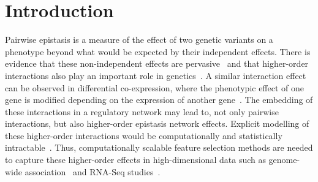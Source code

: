 \documentclass{bioinfo}
\begin{document}

\maketitle

\newpage

\section{Introduction}

Pairwise epistasis is a measure of the effect of two genetic variants on a phenotype beyond what would be expected by their independent effects.
There is evidence that these non-independent effects are pervasive~\citep{breen12} and that higher-order interactions also play an important role in genetics~\citep{weinreich13}.
A similar interaction effect can be observed in differential co-expression, where the phenotypic effect of one gene is modified depending on the expression of another gene~\citep{lareau15,diffcoexp10}.
The embedding of these interactions in a regulatory network may lead to, not only pairwise interactions, but also higher-order epistasis network effects.
Explicit modelling of these higher-order interactions would be computationally and statistically intractable~\citep{riesselman18}.
Thus, computationally scalable feature selection methods are needed to capture these higher-order effects in high-dimensional data such as genome-wide association~\citep{titv} and RNA-Seq studies~\citep{stir}.
\end{document}
